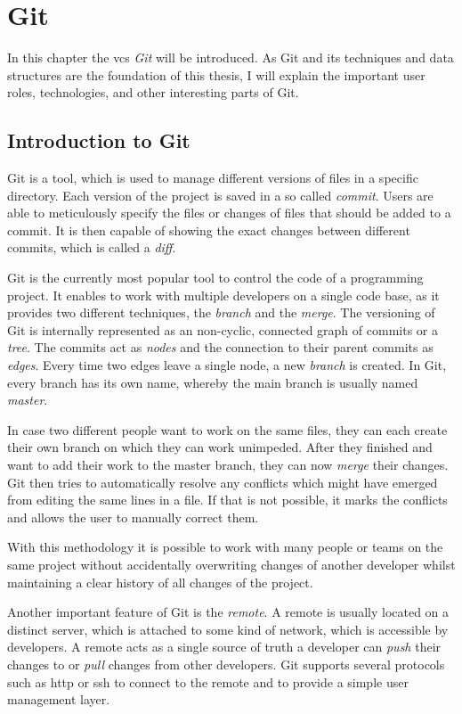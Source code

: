\chapter{Git}\label{git-explanation}
In this chapter the \ac{vcs} \emph{Git} will be introduced. As Git and its techniques and data structures are the foundation of this thesis, I will explain the important user roles, technologies, and other interesting parts of Git.


\section{Introduction to Git}
Git is a tool, which is used to manage different versions of files in a specific directory.
Each version of the project is saved in a so called \emph{commit}.
Users are able to meticulously specify the files or changes of files that should be added to a commit. It is then capable of showing the exact changes between different commits, which is called a \emph{diff}.

Git is the currently  most popular tool to control the code of a programming project.
It enables to work with multiple developers on a single code base, as it provides two different techniques, the \emph{branch} and the \emph{merge}.
The versioning of Git is internally represented as an non-cyclic, connected graph of commits or a \emph{tree}.
The commits act as \emph{nodes} and the connection to their parent commits as \emph{edges}.
Every time two edges leave a single node, a new \emph{branch} is created.
In Git, every branch has its own name, whereby the main branch is usually named \emph{master}.

In case two different people want to work on the same files, they can each create their own branch on which they can work unimpeded.
After they finished and want to add their work to the master branch, they can now \emph{merge} their changes.
Git then tries to automatically resolve any conflicts which might have emerged from editing the same lines in a file.
If that is not possible, it marks the conflicts and allows the user to manually correct them.


With this methodology it is possible to work with many people or teams on the same project without accidentally overwriting changes of another developer whilst maintaining a clear history of all changes of the project.

Another important feature of Git is the \emph{remote}.
A remote is usually located on a distinct server, which is attached to some kind of network, which is accessible by developers.
A remote acts as a single source of truth a developer can \emph{push} their changes to or \emph{pull} changes from other developers.
Git supports several protocols such as \ac{http} or \ac{ssh} to connect to the remote and to provide a simple user management layer.


